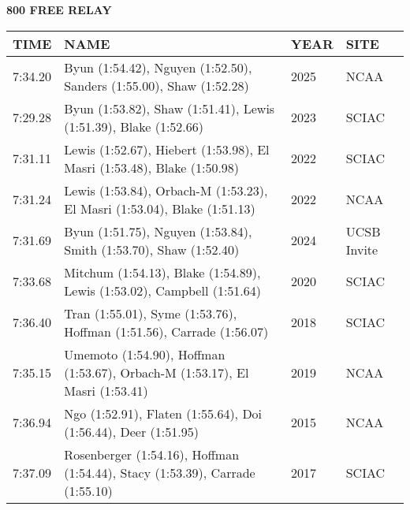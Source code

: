 \begin{center}
\begin{minipage}[t]{0.7\textwidth}
\centering
\textbf{800 FREE RELAY}\\[0.05cm]
\begin{tabular}{@{}p{1.8cm}p{2.8cm}p{1.2cm}p{1.4cm}@{}}
\hline
\textbf{TIME} & \textbf{NAME} & \textbf{YEAR} & \textbf{SITE} \\
\hline
7:34.20 & Byun (1:54.42), Nguyen (1:52.50), Sanders (1:55.00), Shaw (1:52.28) & 2025 & NCAA \\
7:29.28 & Byun (1:53.82), Shaw (1:51.41), Lewis (1:51.39), Blake (1:52.66) & 2023 & SCIAC \\
7:31.11 & Lewis (1:52.67), Hiebert (1:53.98), El Masri (1:53.48), Blake (1:50.98) & 2022 & SCIAC \\
7:31.24 & Lewis (1:53.84), Orbach-M (1:53.23), El Masri (1:53.04), Blake (1:51.13) & 2022 & NCAA \\
7:31.69 & Byun (1:51.75), Nguyen (1:53.84), Smith (1:53.70), Shaw (1:52.40) & 2024 & UCSB Invite \\
7:33.68 & Mitchum (1:54.13), Blake (1:54.89), Lewis (1:53.02), Campbell (1:51.64) & 2020 & SCIAC \\
7:36.40 & Tran (1:55.01), Syme (1:53.76), Hoffman (1:51.56), Carrade (1:56.07) & 2018 & SCIAC \\
7:35.15 & Umemoto (1:54.90), Hoffman (1:53.67), Orbach-M (1:53.17), El Masri (1:53.41) & 2019 & NCAA \\
7:36.94 & Ngo (1:52.91), Flaten (1:55.64), Doi (1:56.44), Deer (1:51.95) & 2015 & NCAA \\
7:37.09 & Rosenberger (1:54.16), Hoffman (1:54.44), Stacy (1:53.39), Carrade (1:55.10) & 2017 & SCIAC \\
\hline
\end{tabular}
\end{minipage}
\end{center}

\vspace{0.4cm}


